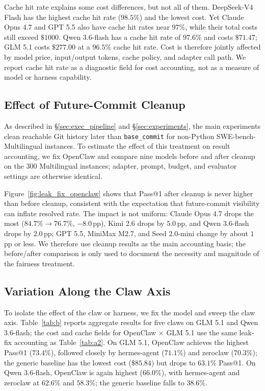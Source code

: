 \documentclass{llmxive}
\begin{document}
Cache hit rate explains some cost differences, but not all of them. DeepSeek-V4 Flash has the highest cache hit rate ($98.5\%$) and the lowest cost. Yet Claude Opus 4.7 and GPT 5.5 also have cache hit rates near $97\%$, while their total costs still exceed $\$1000$. Qwen 3.6-flash has a cache hit rate of $97.6\%$ and costs $\$71.47$; GLM 5.1 costs $\$277.00$ at a $96.5\%$ cache hit rate. Cost is therefore jointly affected by model price, input/output tokens, cache policy, and adapter call path. We report cache hit rate as a diagnostic field for cost accounting, not as a measure of model or harness capability.

\subsection{Effect of Future-Commit Cleanup}\label{sec:leak_fix}

As described in \S\ref{sec:exec_pipeline} and \S\ref{sec:experiments}, the main experiments clean reachable Git history later than \texttt{base\_commit} for non-Python SWE-bench-Multilingual instances. To estimate the effect of this treatment on result accounting, we fix OpenClaw and compare nine models before and after cleanup on the 300 Multilingual instances; adapter, prompt, budget, and evaluator settings are otherwise identical.



Figure~\ref{fig:leak_fix_openclaw} shows that Pass@1 after cleanup is never higher than before cleanup, consistent with the expectation that future-commit visibility can inflate resolved rate. The impact is not uniform: Claude Opus 4.7 drops the most ($84.7\%\rightarrow76.7\%$, $-8.0$\,pp), Kimi 2.6 drops by $5.0$\,pp, and Qwen 3.6-flash drops by $2.0$\,pp; GPT 5.5, MiniMax M2.7, and Seed 2.0-mini change by about $1$\,pp or less. We therefore use cleanup results as the main accounting basis; the before/after comparison is only used to document the necessity and magnitude of the fairness treatment.

\subsection{Variation Along the Claw Axis}\label{sec:variation_harnesses}

To isolate the effect of the claw or harness, we fix the model and sweep the claw axis. Table~\ref{tab:b} reports aggregate results for five claws on GLM 5.1 and Qwen 3.6-flash; the cost and cache fields for OpenClaw $\times$ GLM 5.1 use the same leak-fix accounting as Table~\ref{tab:a2}. On GLM 5.1, OpenClaw achieves the highest Pass@1 ($73.4\%$), followed closely by hermes-agent ($71.1\%$) and zeroclaw ($70.3\%$); the generic baseline has the lowest cost ($\$85.84$) but drops to $63.1\%$ Pass@1. On Qwen 3.6-flash, OpenClaw is again highest ($66.0\%$), with hermes-agent and zeroclaw at $62.6\%$ and $58.3\%$; the generic baseline falls to $38.6\%$.
\end{document}
